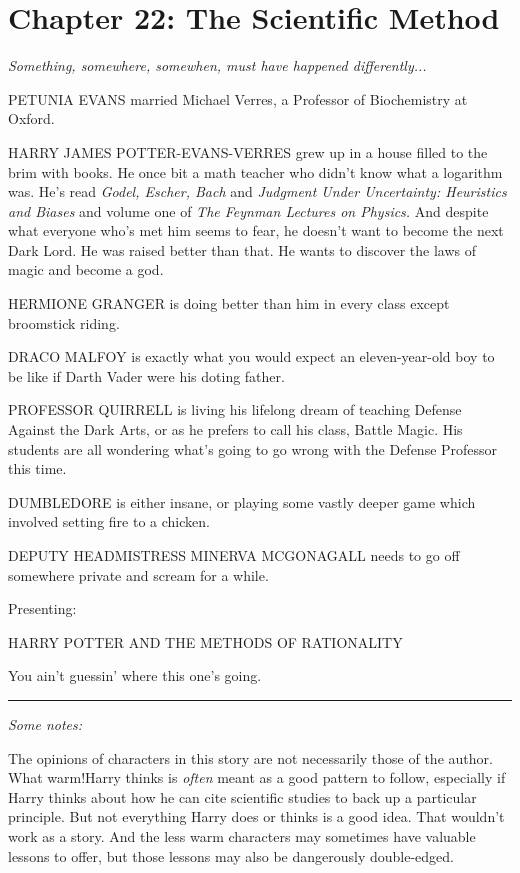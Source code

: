 \chapter{Chapter 22: The Scientific Method}
\emph{Something, somewhere, somewhen, must have happened differently...}

PETUNIA EVANS married Michael Verres, a Professor of Biochemistry at Oxford.

HARRY JAMES POTTER-EVANS-VERRES grew up in a house filled to the brim with books. He once bit a math teacher who didn't know what a logarithm was. He's read \emph{Godel, Escher, Bach} and \emph{Judgment Under Uncertainty: Heuristics and Biases} and volume one of \emph{The Feynman Lectures on Physics.} And despite what everyone who's met him seems to fear, he doesn't want to become the next Dark Lord. He was raised better than that. He wants to discover the laws of magic and become a god.

HERMIONE GRANGER is doing better than him in every class except broomstick riding.

DRACO MALFOY is exactly what you would expect an eleven-year-old boy to be like if Darth Vader were his doting father.

PROFESSOR QUIRRELL is living his lifelong dream of teaching Defense Against the Dark Arts, or as he prefers to call his class, Battle Magic. His students are all wondering what's going to go wrong with the Defense Professor this time.

DUMBLEDORE is either insane, or playing some vastly deeper game which involved setting fire to a chicken.

DEPUTY HEADMISTRESS MINERVA MCGONAGALL needs to go off somewhere private and scream for a while.

Presenting:

HARRY POTTER AND THE METHODS OF RATIONALITY

You ain't guessin' where this one's going.

\begin{center}\rule{3in}{0.4pt}\end{center}

\emph{Some notes:}

The opinions of characters in this story are not necessarily those of the author. What warm!Harry thinks is \emph{often} meant as a good pattern to follow, especially if Harry thinks about how he can cite scientific studies to back up a particular principle. But not everything Harry does or thinks is a good idea. That wouldn't work as a story. And the less warm characters may sometimes have valuable lessons to offer, but those lessons may also be dangerously double-edged.

